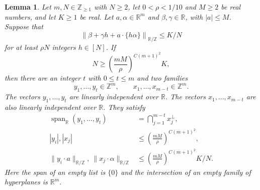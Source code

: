 \documentclass[twoside]{aomart}
\theoremstyle{paperplain}
\newtheorem{lemma}[theorem]{Lemma}
\theoremstyle{paperdefinition}
\numberwithin{equation}{section}
\begin{document}
\begin{lemma}
\label{inv:bracket}
Let $m,N\in\mathbb Z_{\ge1}$ with $N\ge2$, let
$0<\rho<1/10$ and $M\ge2$ be real numbers, and let $K\ge1$ be real.
Let $a,\alpha\in\mathbb R^m$ and $\beta,\gamma\in\mathbb R$, with
$|a|\le M$.  Suppose that
\begin{equation*}
 \left\|\beta+\gamma h+a\cdot\{h\alpha\}\right\|_{\mathbb R/\mathbb Z}
       \le K/N
\end{equation*}
for at least $\rho N$ integers $h\in[N]$.  If
\begin{equation*}
 N\ge\left(\frac{mM}{\rho}\right)^{C(m+1)^2}K,
\end{equation*}
then there are an integer $t$ with $0\le t\le m$ and two families
\[
 y_1,\ldots,y_t\in\mathbb Z^m,\qquad
 x_1,\ldots,x_{m-t}\in\mathbb Z^m.
\]
The vectors $y_1,\ldots,y_t$ are linearly independent over $\mathbb R$.
The vectors $x_1,\ldots,x_{m-t}$ are also linearly independent over
$\mathbb R$. They satisfy
\begin{align}
 \operatorname{span}_{\mathbb R}(y_1,\ldots,y_t)
   &=\bigcap_{j=1}^{m-t}x_j^\perp,
 \\
 |y_i|,|x_j|&\le\left(\frac{mM}{\rho}\right)^{C(m+1)^2},
 \label{inv:eq:bracket-heights}\\
 \|y_i\cdot a\|_{\mathbb R/\mathbb Z},\ \|x_j\cdot\alpha\|_{\mathbb R/\mathbb Z}
 &\le\left(\frac{mM}{\rho}\right)^{C(m+1)^2}K/N.
 \label{inv:eq:bracket-output}
\end{align}
Here the span of an empty list is $\{0\}$ and the intersection of an
empty family of hyperplanes is $\mathbb R^m$.
\end{lemma}
\end{document}
